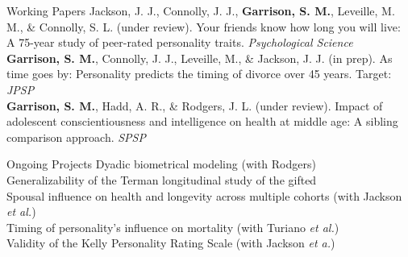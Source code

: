 \documentclass {resume}
\begin{document}
\begin{rSection}{\textrm{Working Papers}}%
Jackson, J. J., Connolly, J. J., {\bf Garrison, S. M.}, Leveille, M. M., \& Connolly, S. L. (under review). Your friends \hspace* {6 mm}know how long you will live: A 75-year study of peer-rated personality traits. \textit{Psychological Science}\smallskip\\
{\bf Garrison, S. M.}, Connolly, J. J., Leveille, M., \& Jackson, J. J. (in prep). As time goes by: Personality predicts the \hspace* {6 mm}timing of divorce over 45 years. Target: \textit{JPSP}\smallskip\\
{\bf Garrison, S. M.}, Hadd, A. R., \& Rodgers, J. L. (under review). Impact of adolescent conscientiousness and \hspace* {6 mm}intelligence on health at middle age: A sibling comparison approach. \textit{SPSP}
\end{rSection}\newpage
\begin{rSection}{\textrm{Ongoing Projects}}
Dyadic biometrical modeling (with Rodgers)\smallskip\\
Generalizability of the Terman longitudinal study of the gifted\smallskip\\
Spousal influence on health and longevity across multiple cohorts (with Jackson \textit{et al.})\smallskip\\
Timing of personality's influence on mortality (with Turiano \textit{et al.})\smallskip\\
Validity of the Kelly Personality Rating Scale (with Jackson \textit{et a.})
\end{rSection}
\end{document}
